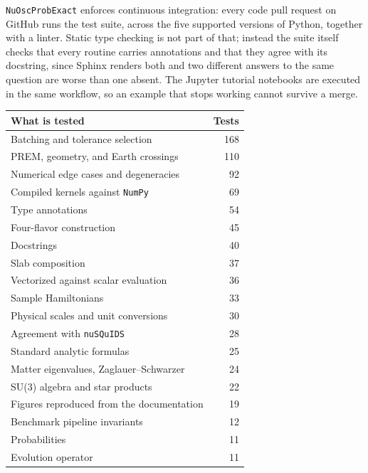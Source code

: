 \documentclass[final,5p,times,twocolumn,sort,compress]{elsarticle}
\begin{document}
{\tt NuOscProbExact} enforces continuous integration: every code pull request on GitHub runs the test suite, across the five supported versions of Python, together with a linter.  Static type checking is not part of that; instead the suite itself checks that every routine carries annotations and that they agree with its docstring, since Sphinx renders both and two different answers to the same question are worse than one absent.  The Jupyter tutorial notebooks are executed in the same workflow, so an example that stops working cannot survive a merge.

{\def\arraystretch{1.15}
\begin{table}[t!]
  \begin{tabular}{lr}
   What is tested & Tests \\
   \hline
   Batching and tolerance selection         & 168 \\
   PREM, geometry, and Earth crossings       & 110 \\
   Numerical edge cases and degeneracies    & 92 \\
   Compiled kernels against {\tt NumPy}      & 69 \\
   Type annotations                         & 54 \\
   Four-flavor construction                 & 45 \\
   Docstrings                               & 40 \\
   Slab composition                         & 37 \\
   Vectorized against scalar evaluation     & 36 \\
   Sample Hamiltonians                      & 33 \\
   Physical scales and unit conversions     & 30 \\
   Agreement with {\tt nuSQuIDS}             & 28 \\
   Standard analytic formulas               & 25 \\
   Matter eigenvalues, Zaglauer--Schwarzer  & 24 \\
   SU(3) algebra and star products          & 22 \\
   Figures reproduced from the documentation & 19 \\
   Benchmark pipeline invariants            & 12 \\
   Probabilities                            & 11 \\
   Evolution operator                       & 11 \\

\end{tabular}
\end{table}}
\end{document}
